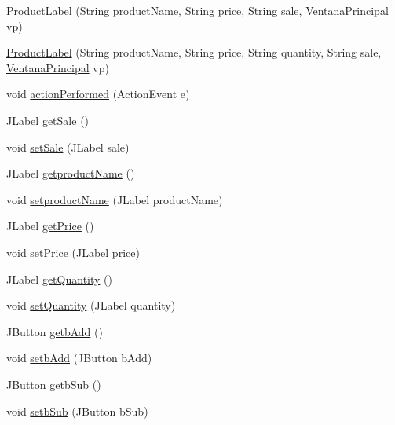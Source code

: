 \begin{DoxyCompactItemize}
\item 
\mbox{\hyperlink{class_s_p_q_1_1gui_1_1component_1_1_product_label_a39cba3384790cdbcb8dc6d9e60d01196}{Product\+Label}} (String product\+Name, String price, String sale, \mbox{\hyperlink{class_s_p_q_1_1gui_1_1_ventana_principal}{Ventana\+Principal}} vp)
\item 
\mbox{\hyperlink{class_s_p_q_1_1gui_1_1component_1_1_product_label_ad2a715926b802401b162793f217a26f7}{Product\+Label}} (String product\+Name, String price, String quantity, String sale, \mbox{\hyperlink{class_s_p_q_1_1gui_1_1_ventana_principal}{Ventana\+Principal}} vp)
\item 
void \mbox{\hyperlink{class_s_p_q_1_1gui_1_1component_1_1_product_label_aba8c2a34cc8626f5edb81a88e3fc0e9f}{action\+Performed}} (Action\+Event e)
\item 
J\+Label \mbox{\hyperlink{class_s_p_q_1_1gui_1_1component_1_1_product_label_a7841fcd56578df74918d99fa2b705e24}{get\+Sale}} ()
\item 
void \mbox{\hyperlink{class_s_p_q_1_1gui_1_1component_1_1_product_label_a787ff03a48344b80ecb10a3717474cde}{set\+Sale}} (J\+Label sale)
\item 
J\+Label \mbox{\hyperlink{class_s_p_q_1_1gui_1_1component_1_1_product_label_a614cfb4f7e9b89e21e7225ac7c93ef2c}{getproduct\+Name}} ()
\item 
void \mbox{\hyperlink{class_s_p_q_1_1gui_1_1component_1_1_product_label_a820888bdd1a4f5edc81d5a04c29fe31d}{setproduct\+Name}} (J\+Label product\+Name)
\item 
J\+Label \mbox{\hyperlink{class_s_p_q_1_1gui_1_1component_1_1_product_label_a55d169a1939b34ba4c7899daa6b779f6}{get\+Price}} ()
\item 
void \mbox{\hyperlink{class_s_p_q_1_1gui_1_1component_1_1_product_label_a85cc995e0b174583ec6eb7ff075d0f46}{set\+Price}} (J\+Label price)
\item 
J\+Label \mbox{\hyperlink{class_s_p_q_1_1gui_1_1component_1_1_product_label_adcfdea4cb072291bea24728bf75aac10}{get\+Quantity}} ()
\item 
void \mbox{\hyperlink{class_s_p_q_1_1gui_1_1component_1_1_product_label_a04b7651edaba15127338d27e9be013e7}{set\+Quantity}} (J\+Label quantity)
\item 
J\+Button \mbox{\hyperlink{class_s_p_q_1_1gui_1_1component_1_1_product_label_a3651b381b7b22f996108134d4a7c7251}{getb\+Add}} ()
\item 
void \mbox{\hyperlink{class_s_p_q_1_1gui_1_1component_1_1_product_label_ac3981c38ea018be3253d133cd1da8b83}{setb\+Add}} (J\+Button b\+Add)
\item 
J\+Button \mbox{\hyperlink{class_s_p_q_1_1gui_1_1component_1_1_product_label_ab2fd1c3e4990adff5c81f99123197ad1}{getb\+Sub}} ()
\item 
void \mbox{\hyperlink{class_s_p_q_1_1gui_1_1component_1_1_product_label_a1d3899db7326042feaa04a482a86ee8e}{setb\+Sub}} (J\+Button b\+Sub)
\end{DoxyCompactItemize}


